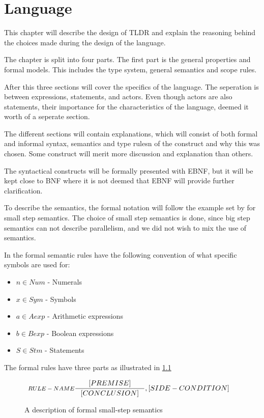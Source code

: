 \chapter{Language}\label{part:design}

This chapter will describe the design of TLDR and explain the reasoning behind the choices made during the design of the language.

The chapter is split into four parts. The first part is the general properties and formal models. This includes the type system, general semantics and scope rules.

After this three sections will cover the specifics of the language. The seperation is between expressions, statements, and actors. Even though actors are also statements, their importance for the characteristics of the language, deemed it worth of a seperate section.

The different sections will contain explanations, which will consist of both formal and informal syntax, semantics and type rulesn of the construct and why this was chosen. Some construct will merit more discussion and explanation than others.

The syntactical constructs will be formally presented with EBNF, but it will be kept close to BNF where it is not deemed that EBNF will provide further clarification. 

To describe the semantics, the formal notation will follow the example set by \cite{huttel2010transitions} for small step semantics. The choice of small step semantics is done, since big step semantics can not describe parallelism, and we did not wish to mix the use of semantics.

In the formal semantic rules have the following convention of what specific symbols are used for:
\begin{itemize}
	\item $n \in Num$ - Numerals
	\item $x \in Sym$ - Symbols
	\item $a \in Aexp$ - Arithmetic expressions
	\item $b \in Bexp$ - Boolean expressions
	\item $S \in Stm$ - Statements	
\end{itemize}

The formal rules have three parts as illustrated in \cref{SS-semantics}

\begin{figure}[H]
\begin{align*}
&\inference[$RULE-NAME$]{[PREMISE]}
                        {[CONCLUSION]}
                        {,[SIDE-CONDITION]}
\end{align*}
\caption{A description of formal small-step semantics}
\label{SS-semantics}
\end{figure}

